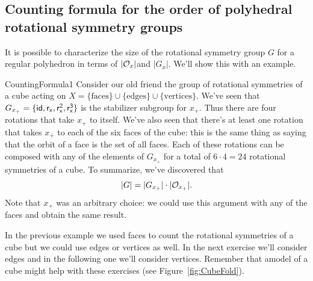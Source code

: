 
\subsection{Counting formula for the order of  polyhedral rotational symmetry groups}
\label{subsec:GroupActions:SymmetryOfPolyhedra:OrderPolyhedralRotSymGroup}

It is possible to characterize the size of the rotational symmetry group $G$ for a regular polyhedron in terms of $|{\cal O}_x|$and $|G_x|$. We'll show this with an example.

\begin{example}{CountingFormula1} 
Consider our old friend the group of rotational symmetries of a cube acting on $X=\{\text{faces}\}\cup\{\text{edges}\}\cup\{\text{vertices}\}$. We've seen that $G_{x_+}=\{\sf{id},r_x,r_x^2,r_x^3\}$ is the stabilizer subgroup for $x_+$.  Thus there are four rotations that take $x_+$ to itself.  We've also seen that there's at least one rotation that takes $x_+$ to each of the six faces of the cube:  this is the same thing as saying that the orbit of a face is the set of all faces.  Each of these rotations can be composed with any of the elements of $G_{x_+}$ for a total of $6\cdot 4=24$ rotational symmetries of a cube.  To summarize, we've discovered that 
$$|G|=|G_{x_+}|\cdot |{\cal O}_{x_+}|.$$
Note that $x_+$ was an arbitrary choice: we could use this argument with any of the faces and obtain the same result.
\end{example}

In the previous example we used faces to count the rotational symmetries of a cube but we could use edges or vertices as well.  In the next exercise we'll consider edges and in the following one we'll consider vertices.   Remember that amodel of a cube might help with these exercises (see Figure~\ref{fig:CubeFold}).

